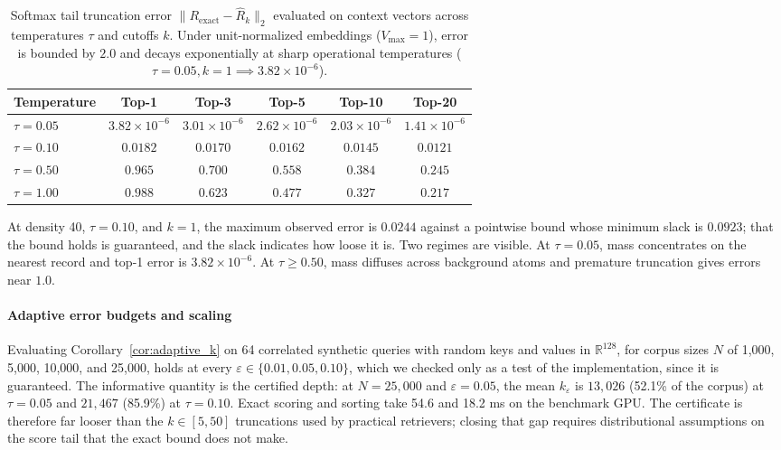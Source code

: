 \documentclass[preprint,12pt]{elsarticle}
\newcommand{\R}{\mathbb{R}}
\newcommand{\rev}[1]{#1}
\begin{document}
\begin{table}[t]
\centering
\caption{Softmax tail truncation error $\| R_{\mathrm{exact}} - \hat{R}_k \|_2$ evaluated on context vectors across temperatures $\tau$ and cutoffs $k$. Under unit-normalized embeddings ($V_{\max}=1$), error is bounded by $2.0$ and decays exponentially at sharp operational temperatures ($\tau = 0.05, k=1 \implies 3.82 \times 10^{-6}$).}
\label{tab:truncation_error}
\vspace{0.5em}
\footnotesize
\begin{tabular}{@{}lccccc@{}}
\toprule
Temperature & Top-1 & Top-3 & Top-5 & Top-10 & Top-20 \\
\midrule
$\tau = 0.05$ & $3.82 \times 10^{-6}$ & $3.01 \times 10^{-6}$ & $2.62 \times 10^{-6}$ & $2.03 \times 10^{-6}$ & $1.41 \times 10^{-6}$ \\
$\tau = 0.10$ & $0.0182$ & $0.0170$ & $0.0162$ & $0.0145$ & $0.0121$ \\
$\tau = 0.50$ & $0.965$ & $0.700$ & $0.558$ & $0.384$ & $0.245$ \\
$\tau = 1.00$ & $0.988$ & $0.623$ & $0.477$ & $0.327$ & $0.217$ \\
\bottomrule
\end{tabular}
\end{table}

At density 40, $\tau=0.10$, and $k=1$, the maximum observed error is $0.0244$ \rev{against a pointwise bound whose minimum slack is $0.0923$; that the bound holds is guaranteed, and the slack indicates how loose it is.} Two regimes are visible. At $\tau = 0.05$, mass concentrates on the nearest record and top-1 error is $3.82 \times 10^{-6}$. At $\tau \ge 0.50$, mass diffuses across background atoms and premature truncation gives errors near $1.0$.

\paragraph{Adaptive error budgets and scaling}
Evaluating Corollary~\ref{cor:adaptive_k} on 64 correlated synthetic queries with random keys and values in $\R^{128}$, for corpus sizes $N$ of 1,000, 5,000, 10,000, and 25,000, \rev{holds at every $\varepsilon \in \{0.01, 0.05, 0.10\}$, which we checked only as a test of the implementation, since it is guaranteed.} The informative quantity is the certified depth: at $N=25{,}000$ and $\varepsilon=0.05$, the mean $k_\varepsilon$ is $13{,}026$ (52.1\% of the corpus) at $\tau=0.05$ and $21{,}467$ (85.9\%) at $\tau=0.10$. Exact scoring and sorting take 54.6 and 18.2 ms on the benchmark GPU. The certificate is therefore far looser than the $k\in[5,50]$ truncations used by practical retrievers; closing that gap requires distributional assumptions on the score tail that the exact bound does not make.
\end{document}
